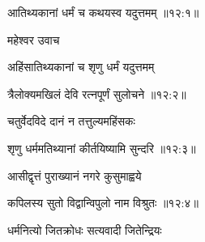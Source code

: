 
{\devanagarifont आतिथ्यकानां धर्मं च कथयस्व यदुत्तमम् {॥१२:१॥} \veg\dontdisplaylinenum }%

{\devanagarifont महेश्वर उवाच {\dandab}\dontdisplaylinenum  }%

{\devanagarifont अहिंसातिथ्यकानां च शृणु धर्मं यदुत्तमम् \thinspace{\danda} \dontdisplaylinenum }%


{\devanagarifont त्रैलोक्यमखिलं देवि रत्नपूर्णं सुलोचने {॥१२:२॥} \veg\dontdisplaylinenum }%

{\devanagarifont चतुर्वेदविदे दानं न तत्तुल्यमहिंसकः \thinspace{\dandab} \dontdisplaylinenum }%


{\devanagarifont शृणु धर्ममतिथ्यानां कीर्तयिष्यामि सुन्दरि {॥१२:३॥} \veg\dontdisplaylinenum }%
 

{\devanagarifont आसीद्वृत्तं पुराख्यानं नगरे कुसुमाह्वये \thinspace{\dandab} \dontdisplaylinenum }%


{\devanagarifont कपिलस्य सुतो विद्वान्विपुलो नाम विश्रुतः {॥१२:४॥} \veg\dontdisplaylinenum }%
 
{\devanagarifont धर्मनित्यो जितक्रोधः सत्यवादी जितेन्द्रियः \thinspace{\dandab} \dontdisplaylinenum }%

